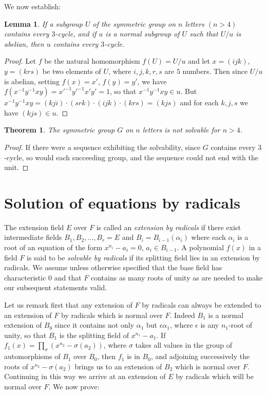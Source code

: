 \documentclass[10pt,leqno,a5paper]{book}
\newtheorem{theo}{Theorem}
\newtheorem*{lemm*}{Lemma}
\theoremstyle{definition}
\let\htw\section
\begin{document}
We now establish:

\begin{lemm*}
If a subgroup $U$ of the symmetric group on $n$ letters $(n > 4)$ contains every $3$-cycle, and if $u$ is a normal subgroup of $U$ such that $U / u$ is abelian, then $u$ contains every $3$-cycle.
\end{lemm*}


\begin{proof}
Let $f$ be the natural homomorphism $f(U) = U/u$ and let $x = (ijk)$, $y = (krs)$ be two elements of $U$, where $i,j,k,r,s$ are $5$ numbers.
Then since $U/u$ is abelian, setting $f(x) = x'$, $f(y) = y'$, we have $f(x^{-1}y^{-1}xy) = {x'}^{-1} {y'}^{-1} x' y' = 1$, so that $x^{-1}y^{-1}xy \in u$.
But $x^{-1}y^{-1}xy = (kji) \cdot (srk) \cdot (ijk) \cdot (krs) = (kjs)$ and for each $k,j,s$ we have $(kjs) \in u$.
\end{proof}

\begin{theo}
\label{theo:III.4}
The symmetric group $G$ on $n$ letters is not solvable for $n > 4$.
\end{theo}

\begin{proof}
If there were a sequence exhibiting the solvability, since $G$ contains every $3$-cycle, so would each succeeding group, and the sequence could not end with the unit.
\end{proof}


\htw{Solution of equations by radicals}

The extension field $E$ over $F$ is called an \emph{extension by radicals} if there exist intermediate fields $B_1, B_2, \ldots, B_r = E$ and $B_i = B_{i-1}(\alpha_i)$ where each $\alpha_i$ is a root of an equation of the form $x^{n_i} - a_i = 0$, $a_i \in B_{i-1}$.
A polynomial $f(x)$ in a field $F$ is said to be \emph{solvable by radicals} if its splitting field lies in an extension by radicals.
We assume unless otherwise specified that the base field has characteristic $0$ and that $F$ contains as many roots of unity as are needed to make our subsequent statements valid.

Let us remark first that any extension of $F$ by radicals can always be extended to an extension of $F$ by radicals which is normal over $F$.
Indeed $B_1$ is a normal extension of $B_0$ since it contains not only $\alpha_1$ but $\epsilon \alpha_1$, where $\epsilon$ is any $n_1$-root of unity, so that $B_1$ is the splitting field of $x^{n_1} - a_1$.
If $f_1(x) = \prod_\sigma (x^{n_2} - \sigma(a_2))$, where $\sigma$ takes all values in the group of automorphisms of $B_1$ over $B_0$, then $f_1$ is in $B_0$, and adjoining successively the roots of $x^{n_2} - \sigma(a_2)$ brings us to an extension of $B_2$ which is normal over $F$.
Continuing in this way we arrive at an extension of $E$ by radicals which will be normal over $F$.
We now prove:
\end{document}

